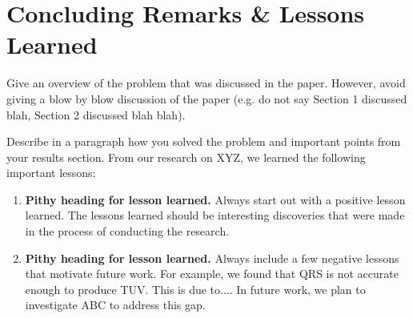 \section{Concluding Remarks \& Lessons Learned}
\label{conclusion}

Give an overview of the problem that was discussed in the
paper. However, avoid giving a blow by blow
discussion of the paper (e.g. do not say
Section 1 discussed blah, Section 2 discussed
blah blah).

Describe in a paragraph how you solved the problem
and important points from your results section.
From our research on XYZ, we learned the following
important lessons:

\begin{enumerate}

\item \textbf{Pithy heading for lesson learned.} Always
start out with a positive lesson learned. The lessons
learned should be interesting discoveries that were
made in the process of conducting the research.

\item \textbf{Pithy heading for lesson learned.} Always
include a few negative lessons that motivate future
work. For example, we found that QRS is not accurate
enough to produce TUV. This is due to.... In future
work, we plan to investigate ABC to address this gap.

\end{enumerate}
